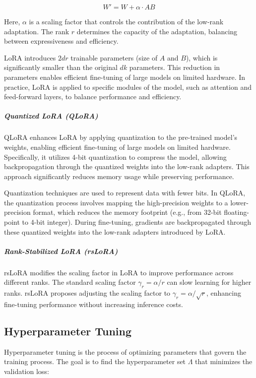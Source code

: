 \documentclass[11pt, onecolumn]{article}
\newcounter{para}
\begin{document}
\[
W' = W + \alpha \cdot A B
\]

Here, \( \alpha \) is a scaling factor that controls the contribution of the low-rank adaptation. The rank \( r \) determines the capacity of the adaptation, balancing between expressiveness and efficiency.

LoRA introduces \( 2dr \) trainable parameters (size of \( A \) and \( B \)), which is significantly smaller than the original \( dk \) parameters. This reduction in parameters enables efficient fine-tuning of large models on limited hardware. In practice, LoRA is applied to specific modules of the model, such as attention and feed-forward layers, to balance performance and efficiency.

\subparagraph{Quantized LoRA (QLoRA)}

QLoRA enhances LoRA by applying quantization to the pre-trained model's weights, enabling efficient fine-tuning of large models on limited hardware. Specifically, it utilizes 4-bit quantization to compress the model, allowing backpropagation through the quantized weights into the low-rank adapters. This approach significantly reduces memory usage while preserving performance.

Quantization techniques are used to represent data with fewer bits. In QLoRA, the quantization process involves mapping the high-precision weights to a lower-precision format, which reduces the memory footprint (e.g., from 32-bit floating-point to 4-bit integer). During fine-tuning, gradients are backpropagated through these quantized weights into the low-rank adapters introduced by LoRA.

\subparagraph{Rank-Stabilized LoRA (rsLoRA)}

rsLoRA modifies the scaling factor in LoRA to improve performance across different ranks. The standard scaling factor \( \gamma_r = \alpha / r \) can slow learning for higher ranks. rsLoRA proposes adjusting the scaling factor to \( \gamma_r = \alpha / \sqrt{r} \), enhancing fine-tuning performance without increasing inference costs.

\subsection{Hyperparameter Tuning}

Hyperparameter tuning is the process of optimizing parameters that govern the training process. The goal is to find the hyperparameter set \( \Lambda \) that minimizes the validation loss:
\end{document}
